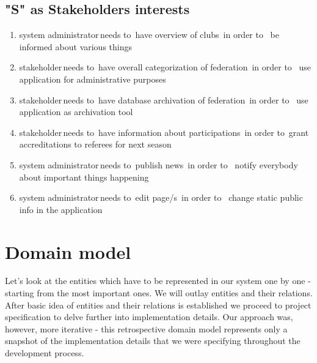 \subsection*{"S" as Stakeholders interests}
\begin{enumerate}
  \item \lbrack system administrator\rbrack \,needs to\, \lbrack have overview of clubs\rbrack \, in order to \, \lbrack be informed about various things\rbrack
  \item \lbrack stakeholder\rbrack \,needs to\, \lbrack have overall categorization of federation\rbrack \, in order to \, \lbrack use application for administrative purposes\rbrack
  \item \lbrack stakeholder\rbrack \,needs to\, \lbrack have database archivation of federation\rbrack \, in order to \, \lbrack use application as archivation tool\rbrack
  \item \lbrack stakeholder\rbrack \,needs to\, \lbrack have information about participations\rbrack \, in order to\, \lbrack grant accreditations to referees for next season\rbrack
  \item \lbrack system administrator\rbrack \,needs to\, \lbrack publish news\rbrack \, in order to \, \lbrack notify everybody about important things happening\rbrack
  \item \lbrack system administrator\rbrack \,needs to\, \lbrack edit page/s\rbrack \, in order to \, \lbrack change static public info in the application\rbrack
\end{enumerate}
\section{Domain model}
Let's look at the entities which have to be represented in our system one by one - starting from the most important ones. We will outlay entities and their relations. After basic idea of entities and their relations is established we proceed to project specification to delve further into implementation details. Our approach was, however, more iterative - this retrospective domain model represents only a snapshot of the implementation details that we were specifying throughout the development process.
\par
